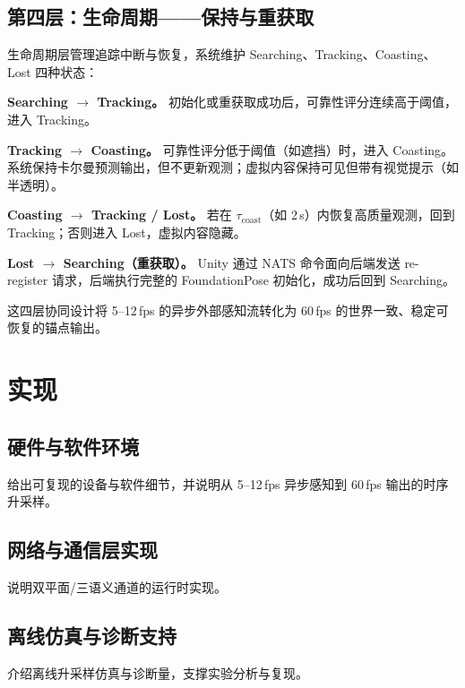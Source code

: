 \documentclass[review]{vgtc}
\begin{document}
\subsection{第四层：生命周期——保持与重获取}

生命周期层管理追踪中断与恢复，系统维护 Searching、Tracking、Coasting、Lost 四种状态：

\noindent\textbf{Searching $\rightarrow$ Tracking。} 初始化或重获取成功后，可靠性评分连续高于阈值，进入 Tracking。

\noindent\textbf{Tracking $\rightarrow$ Coasting。} 可靠性评分低于阈值（如遮挡）时，进入 Coasting。系统保持卡尔曼预测输出，但不更新观测；虚拟内容保持可见但带有视觉提示（如半透明）。

\noindent\textbf{Coasting $\rightarrow$ Tracking / Lost。} 若在 $\tau_{\text{coast}}$（如 2\,s）内恢复高质量观测，回到 Tracking；否则进入 Lost，虚拟内容隐藏。

\noindent\textbf{Lost $\rightarrow$ Searching（重获取）。} Unity 通过 NATS 命令面向后端发送 re-register 请求，后端执行完整的 FoundationPose 初始化，成功后回到 Searching。

这四层协同设计将 5--12\,fps 的异步外部感知流转化为 60\,fps 的世界一致、稳定可恢复的锚点输出。

\section{实现}

\subsection{硬件与软件环境}
给出可复现的设备与软件细节，并说明从 5--12\,fps 异步感知到 60\,fps 输出的时序升采样。

\subsection{网络与通信层实现}
说明双平面/三语义通道的运行时实现。

\subsection{离线仿真与诊断支持}
介绍离线升采样仿真与诊断量，支撑实验分析与复现。
\end{document}
